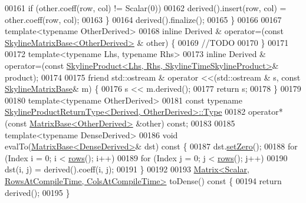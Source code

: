 \begin{DoxyCode}
00161                 \textcolor{keywordflow}{if} (other.coeff(row, col) != Scalar(0))
00162                     derived().insert(row, col) = other.coeff(row, col);
00163             \}
00164         derived().finalize();
00165     \}
00166 
00167     \textcolor{keyword}{template}<\textcolor{keyword}{typename} OtherDerived>
00168             \textcolor{keyword}{inline} Derived & operator=(\textcolor{keyword}{const} \hyperlink{class_eigen_1_1_skyline_matrix_base}{SkylineMatrixBase<OtherDerived>}
      & other) \{
00169         \textcolor{comment}{//TODO}
00170     \}
00171 
00172     \textcolor{keyword}{template}<\textcolor{keyword}{typename} Lhs, \textcolor{keyword}{typename} Rhs>
00173             \textcolor{keyword}{inline} Derived & operator=(\textcolor{keyword}{const} 
      \hyperlink{class_eigen_1_1_skyline_product}{SkylineProduct<Lhs, Rhs, SkylineTimeSkylineProduct>}& 
      product);
00174 
00175     \textcolor{keyword}{friend} std::ostream & operator <<(std::ostream & s, \textcolor{keyword}{const} \hyperlink{class_eigen_1_1_skyline_matrix_base}{SkylineMatrixBase}& m) \{
00176         s << m.derived();
00177         \textcolor{keywordflow}{return} s;
00178     \}
00179 
00180     \textcolor{keyword}{template}<\textcolor{keyword}{typename} OtherDerived>
00181     \textcolor{keyword}{const} \textcolor{keyword}{typename} \hyperlink{class_eigen_1_1_skyline_product}{SkylineProductReturnType<Derived, OtherDerived>::Type}
00182     operator*(\textcolor{keyword}{const} \hyperlink{group___core___module_class_eigen_1_1_matrix_base}{MatrixBase<OtherDerived>} &other) \textcolor{keyword}{const};
00183 
00185     \textcolor{keyword}{template}<\textcolor{keyword}{typename} DenseDerived>
00186     \textcolor{keywordtype}{void} evalTo(\hyperlink{group___core___module_class_eigen_1_1_matrix_base}{MatrixBase<DenseDerived>}& dst)\textcolor{keyword}{ const }\{
00187         dst.\hyperlink{group___core___module_ac74411ddeea2545bf20baf14613be47e}{setZero}();
00188         \textcolor{keywordflow}{for} (Index i = 0; i < \hyperlink{class_eigen_1_1_skyline_matrix_base_a8243b2fe6bcc6c3037717fcb0afa9d46}{rows}(); i++)
00189             \textcolor{keywordflow}{for} (Index j = 0; j < \hyperlink{class_eigen_1_1_skyline_matrix_base_a8243b2fe6bcc6c3037717fcb0afa9d46}{rows}(); j++)
00190                 dst(i, j) = derived().coeff(i, j);
00191     \}
00192 
00193     \hyperlink{group___core___module_class_eigen_1_1_matrix}{Matrix<Scalar, RowsAtCompileTime, ColsAtCompileTime>}
       toDense()\textcolor{keyword}{ const }\{
00194         \textcolor{keywordflow}{return} derived();
00195     \}

\end{DoxyCode}

